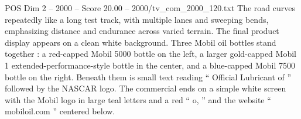 \begin{textsample}{POS Dim 2 – 2000 – Score 20.00 – 2000/tv\_com\_2000\_120.txt}
The road curves repeatedly like a long test track, with multiple lanes and sweeping bends, emphasizing distance and endurance across varied terrain.
The final product display appears on a clean white background.
Three Mobil oil bottles stand together : a red-capped Mobil 5000 bottle on the left, a larger gold-capped Mobil 1 extended-performance-style bottle in the center, and a blue-capped Mobil 7500 bottle on the right.
Beneath them is small text reading “ Official Lubricant of ” followed by the NASCAR logo.
The commercial ends on a simple white screen with the Mobil logo in large teal letters and a red “ o, ” and the website “ mobiloil.com ” centered below.

\end{textsample}
